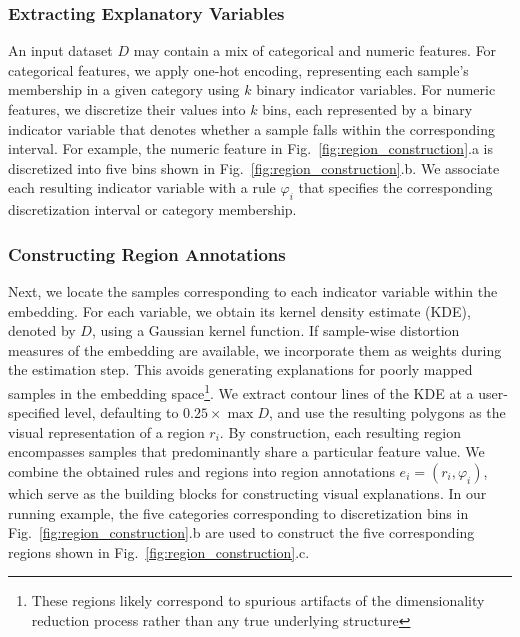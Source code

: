 \documentclass[lettersize,journal]{IEEEtran}
\begin{document}
\subsubsection{Extracting Explanatory Variables}
\label{sec:discretization}

An input dataset $D$ may contain a mix of categorical and numeric features.
For categorical features, we apply one-hot encoding, representing each sample's membership in a given category using $k$ binary indicator variables.
For numeric features, we discretize their values into $k$ bins, each represented by a binary indicator variable that denotes whether a sample falls within the corresponding interval.
For example, the numeric feature in Fig.~\ref{fig:region_construction}.a is discretized into five bins shown in Fig.~\ref{fig:region_construction}.b.
We associate each resulting indicator variable with a rule $\varphi_i$ that specifies the corresponding discretization interval or category membership.

\subsubsection{Constructing Region Annotations}

Next, we locate the samples corresponding to each indicator variable within the embedding.
For each variable, we obtain its kernel density estimate (KDE), denoted by $D$, using a Gaussian kernel function.
If sample-wise distortion measures of the embedding are available, we incorporate them as weights during the estimation step. This avoids generating explanations for poorly mapped samples in the embedding space\footnote{These regions likely correspond to spurious artifacts of the dimensionality reduction process rather than any true underlying structure}.
We extract contour lines of the KDE at a user-specified level, defaulting to $0.25 \times \max D$, and use the resulting polygons as the visual representation of a region $r_i$.
By construction, each resulting region encompasses samples that predominantly share a particular feature value.
We combine the obtained rules and regions into region annotations $e_i = \left( r_i, \varphi_i \right)$, which serve as the building blocks for constructing visual explanations.
In our running example, the five categories corresponding to discretization bins in Fig.~\ref{fig:region_construction}.b are used to construct the five corresponding regions shown in Fig.~\ref{fig:region_construction}.c.
\end{document}
